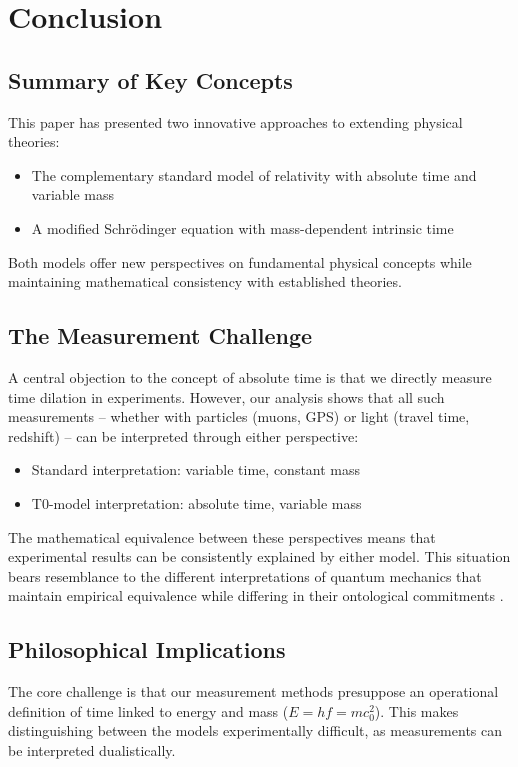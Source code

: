 \documentclass[a4paper,12pt]{article}
\begin{document}
	\section{Conclusion}
	
	\subsection{Summary of Key Concepts}
	This paper has presented two innovative approaches to extending physical theories:
	
	\begin{itemize}[leftmargin=*,nosep]
		\item The complementary standard model of relativity with absolute time and variable mass
		\item A modified Schrödinger equation with mass-dependent intrinsic time
	\end{itemize}
	
	Both models offer new perspectives on fundamental physical concepts while maintaining mathematical consistency with established theories.
	
	\subsection{The Measurement Challenge}
	A central objection to the concept of absolute time is that we directly measure time dilation in experiments. However, our analysis shows that all such measurements -- whether with particles (muons, GPS) or light (travel time, redshift) -- can be interpreted through either perspective:
	
	\begin{itemize}[leftmargin=*,nosep]
		\item Standard interpretation: variable time, constant mass
		\item T0-model interpretation: absolute time, variable mass
	\end{itemize}
	
	The mathematical equivalence between these perspectives means that experimental results can be consistently explained by either model. This situation bears resemblance to the different interpretations of quantum mechanics that maintain empirical equivalence while differing in their ontological commitments \cite{Schlosshauer2013}.
	
	\subsection{Philosophical Implications}
	The core challenge is that our measurement methods presuppose an operational definition of time linked to energy and mass ($E = h f = m c_0^2$). This makes distinguishing between the models experimentally difficult, as measurements can be interpreted dualistically.
	
\end{document}
